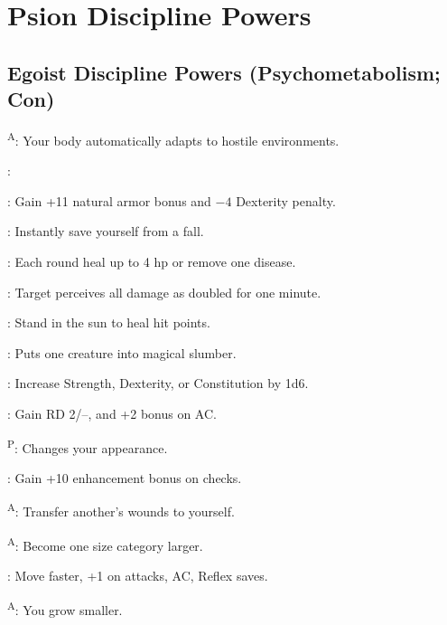 \section{Psion Discipline Powers}



\subsection{Egoist Discipline Powers {\normalsize(Psychometabolism; Con)}}
\begin{enumerate*}
\item {}\textsuperscript{A}: Your body automatically adapts to hostile environments.

      :

      : Gain +11 natural armor bonus and $-4$ Dexterity penalty.

      : Instantly save yourself from a fall. %

      : Each round heal up to 4 hp or remove one disease.

      : Target perceives all damage as doubled for one minute.

      : Stand in the sun to heal hit points.

      : Puts one creature into magical slumber.

\item {}: Increase Strength, Dexterity, or Constitution by 1d6.

      : Gain RD 2/--, and +2 bonus on AC.

      \textsuperscript{P}: Changes your appearance.

      : Gain +10 enhancement bonus on  checks. %

      \textsuperscript{A}: Transfer another's wounds to yourself. %

      \textsuperscript{A}: Become one size category larger. %

      : Move faster, +1 on attacks, AC, Reflex saves.

      \textsuperscript{A}: You grow smaller. %


\end{enumerate*}
